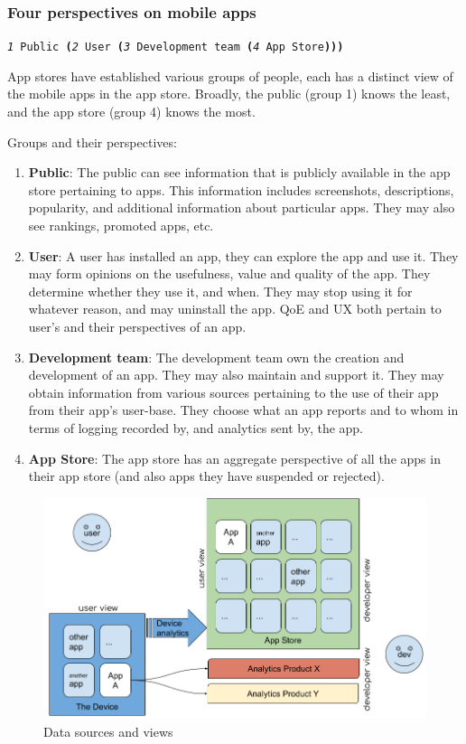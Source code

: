 \subsubsection{Four perspectives on mobile apps}
\large{\texttt{\emph{1} Public \textbf{(}\emph{2} User \textbf{(}\emph{3} Development team \textbf{(}\emph{4} App Store\textbf{)))}}}

App stores have established various groups of people, each has a distinct view of the mobile apps in the app store. Broadly, the public (group 1) knows the least, and the app store (group 4) knows the most.

Groups and their perspectives:
\begin{enumerate}
    \item \textbf{Public}: The public can see information that is publicly available in the app store pertaining to apps. This information includes screenshots, descriptions, popularity, and additional information about particular apps. They may also see rankings, promoted apps, etc.
    \item \textbf{User}: A user has installed an app, they can explore the app and use it. They may form opinions on the usefulness, value and quality of the app. They determine whether they use it, and when. They may stop using it for whatever reason, and may uninstall the app. QoE and UX both pertain to user's and their perspectives of an app.
    \item \textbf{Development team}: The development team own the creation and development of an app. They may also maintain and support it. They may obtain information from various sources pertaining to the use of their app from their app's user-base. They choose what an app reports and to whom in terms of logging recorded by, and analytics sent by, the app.
    \item \textbf{App Store}: The app store has an aggregate perspective of all the apps in their app store (and also apps they have suspended or rejected).
\end{enumerate}

\begin{figure}[ht]
    \centering
    \includegraphics[width=\textwidth]{images/data_sources_and_views_25_jan_2020.jpg}
    \caption{Data sources and views}
    \label{fig:data_sources_and_views}
\end{figure}

